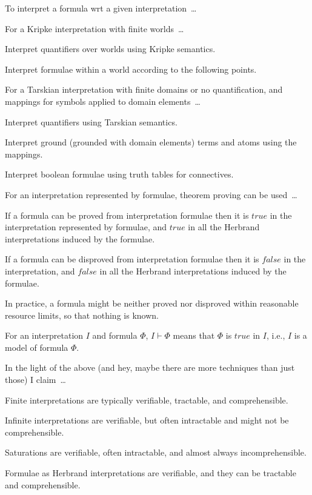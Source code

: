 \documentclass{easychair}
\newenvironment{packed_itemize}{
\vspace*{-0.2em}
\begin{itemize}
\setlength{\partopsep}{0pt}
\setlength{\itemsep}{1pt}
\setlength{\parskip}{0pt}
\setlength{\parsep}{0pt}
}{\end{itemize}}
\begin{document}
To interpret a formula wrt a given interpretation~\ldots
\begin{packed_itemize}
\item For a Kripke interpretation with finite worlds~\ldots
      \begin{packed_itemize}
      \item Interpret quantifiers over worlds using Kripke semantics.
      \item Interpret formulae within a world according to the following points.
      \end{packed_itemize}
\item For a Tarskian interpretation with finite domains or no quantification, and mappings for 
      symbols applied to domain elements~\ldots
      \begin{packed_itemize}
      \item Interpret quantifiers using Tarskian semantics.
      \item Interpret ground (grounded with domain elements) terms and atoms using the mappings.
      \item Interpret boolean formulae using truth tables for connectives.
      \end{packed_itemize}
\item For an interpretation represented by formulae, theorem proving can be used~\ldots
      \begin{packed_itemize}
      \item If a formula can be proved from interpretation formulae then it is $true$ in the 
            interpretation represented by formulae, and $true$ in all the Herbrand interpretations
            induced by the formulae.
      \item If a formula can be disproved from interpretation formulae then it is $false$ in the 
            interpretation, and $false$ in all the Herbrand interpretations induced by the 
            formulae.
      \item In practice, a formula might be neither proved nor disproved within reasonable 
            resource limits, so that nothing is known.
      \end{packed_itemize}
\end{packed_itemize}

For an interpretation $I$ and formula $\Phi$, $I \vdash \Phi$ means that $\Phi$ is $true$ in $I$, 
i.e., $I$ is a model of formula $\Phi$.

In the light of the above (and hey, maybe there are more techniques than just those) I claim~\ldots
\begin{packed_itemize}
\item Finite interpretations are typically verifiable, tractable, and comprehensible.
\item Infinite interpretations are verifiable, but often intractable and might not be 
      comprehensible.
\item Saturations are verifiable, often intractable, and almost always incomprehensible.
\item Formulae as Herbrand interpretations are verifiable, and they can be tractable and
      comprehensible.
\end{packed_itemize}
\end{document}
